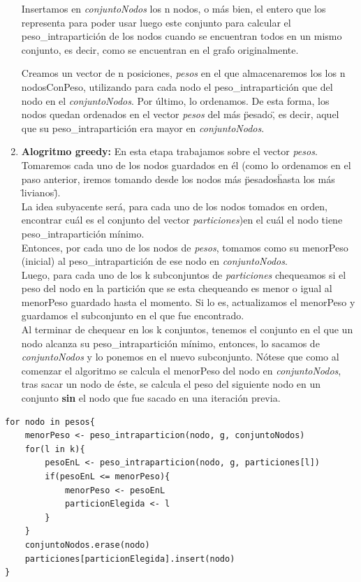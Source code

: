 \documentclass[10pt,a4paper]{article}
\begin{document}
\begin{enumerate}
Insertamos en \textit{conjuntoNodos} los n nodos, o más bien, el entero que los representa para poder usar luego este conjunto para calcular el peso\_intrapartición de los nodos cuando se encuentran todos en un mismo conjunto, es decir, como se encuentran en el grafo originalmente.

Creamos un vector de n posiciones, \textit{pesos} en el que almacenaremos los  los n nodosConPeso, utilizando para cada nodo el peso\_intrapartición que del nodo en el \textit{conjuntoNodos}. Por último, lo ordenamos. De esta forma, los nodos quedan ordenados en el vector \textit{pesos} del más \"pesado\", es decir, aquel que su peso\_intrapartición era mayor en \textit{conjuntoNodos}.\\

\item \textbf{Alogritmo greedy:}
En esta etapa trabajamos sobre el vector \textit{pesos}. Tomaremos cada uno de los nodos guardados en él (como lo ordenamos en el paso anterior, iremos tomando desde los nodos más \"pesados\" hasta los más \"livianos\").\\
La idea subyacente será, para cada uno de los nodos tomados en orden, encontrar cuál es el conjunto del vector \textit{particiones})en el cuál el nodo tiene peso\_intrapartición mínimo.\\
Entonces, por cada uno de los nodos de \textit{pesos}, tomamos como su menorPeso (inicial) al peso\_intrapartición de ese nodo en \textit{conjuntoNodos}.\\
Luego, para cada uno de los k subconjuntos de \textit{particiones} chequeamos si el peso del nodo en la partición que se esta chequeando es menor o igual al menorPeso guardado hasta el momento. Si lo es, actualizamos el menorPeso y guardamos el subconjunto en el que fue encontrado.\\
Al terminar de chequear en los k conjuntos, tenemos el conjunto en el que un nodo alcanza su peso\_intrapartición mínimo, entonces, lo sacamos de \textit{conjuntoNodos} y lo ponemos en el nuevo subconjunto. Nótese que como al comenzar el algoritmo se calcula el menorPeso del nodo en  \textit{conjuntoNodos}, tras sacar un nodo de éste, se calcula el peso del siguiente nodo en un conjunto \textbf{sin} el nodo que fue sacado en una iteración previa.\\
\end{enumerate}

\begin{lstlisting}[mathescape]
for nodo in pesos{
	menorPeso <- peso_intraparticion(nodo, g, conjuntoNodos)
	for(l in k){
		pesoEnL <- peso_intraparticion(nodo, g, particiones[l])
		if(pesoEnL <= menorPeso){
			menorPeso <- pesoEnL
			particionElegida <- l
		}
	}
	conjuntoNodos.erase(nodo)
	particiones[particionElegida].insert(nodo)
}
\end{lstlisting}
\end{document}
